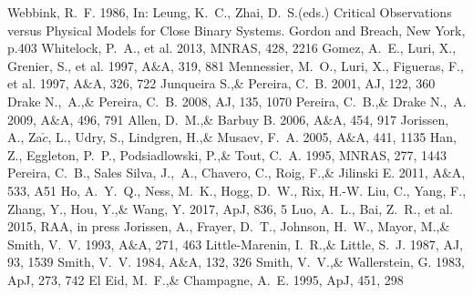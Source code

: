 \documentclass[a4paper,fleqn,usenatbib]{mnras}
\begin{document}
\begin{thebibliography}{99}
Webbink, R.~F. 1986, 
In: Leung, K.~C., Zhai, D.~S.(eds.) Critical Observations versus Physical Models for Close Binary Systems. Gordon and Breach, New York, p.403
Whitelock, P.~A., et al. 2013, 
MNRAS, 428, 2216
Gomez, A.~E., Luri, X., Grenier, S., et al. 1997, 
A$\&$A, 319, 881
Mennessier, M.~O., Luri, X., Figueras, F., et al. 1997, 
A$\&$A, 326, 722
Junqueira S.,\& Pereira, C.~B. 2001, 
AJ, 122, 360
Drake N.,~A.,\& Pereira, C.~B. 2008, 
AJ, 135, 1070
Pereira, C.~B.,\& Drake N.,~A. 2009, 
A$\&$A, 496, 791
Allen, D.~M.,\& Barbuy B. 2006, 
A$\&$A, 454, 917
Jorissen, A., Za$\check{c}$, L., Udry, S., Lindgren, H.,\& Musaev, F.~A. 2005, 
A$\&$A, 441, 1135
Han, Z., Eggleton, P.~P., Podsiadlowski, P.,\& Tout, C.~A. 1995, 
MNRAS, 277, 1443
Pereira, C.~B., Sales Silva, J.,~A., Chavero, C., Roig, F.,\& Jilinski E. 2011, 
A$\&$A, 533, A51
Ho, A.~Y.~Q., Ness, M.~K., Hogg, D.~W., Rix, H.-W. Liu, C., Yang, F., Zhang, Y., Hou, Y.,\& Wang, Y. 2017, 
ApJ, 836, 5
Luo, A.~L., Bai, Z.~R., et al. 2015, 
RAA, in press
Jorissen, A., Frayer, D.~T., Johnson, H.~W., Mayor, M.,\& Smith, V.~V. 1993, 
A$\&$A, 271, 463
Little-Marenin, I.~R.,\& Little, S.~J. 1987, 
AJ, 93, 1539
Smith, V.~V. 1984, 
A$\&$A, 132, 326
Smith, V.~V.,\& Wallerstein, G. 1983, 
ApJ, 273, 742
El Eid, M.~F.,\& Champagne, A.~E. 1995, 
ApJ, 451, 298

\end{thebibliography}
\end{document}
